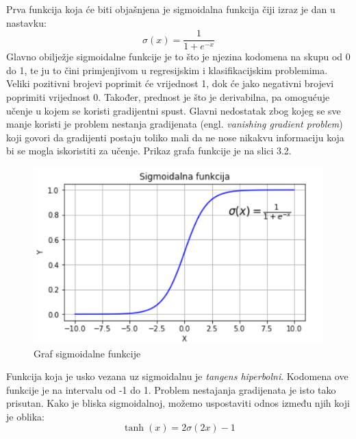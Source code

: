 \documentclass[times, utf8, zavrsni, numeric]{fer}
\begin{document}
Prva funkcija koja će biti objašnjena je sigmoidalna funkcija čiji izraz je dan u nastavku:
\begin{equation}
\sigma(x)=\frac{1}{1 + e^{-x}}
\label{eq:Aktivacija}
\end{equation}
Glavno obilježje sigmoidalne funkcije je to što je njezina kodomena na skupu od 0 do 1, te ju to čini primjenjivom u regresijskim i klasifikacijskim problemima. Veliki pozitivni brojevi poprimit će vrijednost 1, dok će jako negativni brojevi poprimiti vrijednost 0. Također, prednost je što je derivabilna, pa omogućuje učenje u kojem se koristi gradijentni spust. Glavni nedostatak zbog kojeg se sve manje koristi je problem nestanja gradijenata (engl. \textit{vanishing gradient problem}) koji govori da gradijenti postaju toliko mali da ne nose nikakvu informaciju koja bi se mogla iskoristiti za učenje. Prikaz grafa funkcije je na slici 3.2.\\
\begin{figure}[htb]
\centering
\includegraphics[scale=0.6]{img/slika6.png}
\caption{Graf sigmoidalne funkcije}
\label{fig:Perceptron}
\end{figure}
\linebreak
Funkcija koja je usko vezana uz sigmoidalnu je \textit{tangens hiperbolni}. Kodomena ove funkcije je na intervalu od -1 do 1. Problem nestajanja gradijenata je isto tako prisutan. Kako je bliska sigmoidalnoj, možemo uspostaviti odnos između njih koji je oblika:
\begin{equation}
\tanh(x) = 2\sigma(2x)-1
\label{eq:Aktivacija}
\end{equation}
\end{document}
